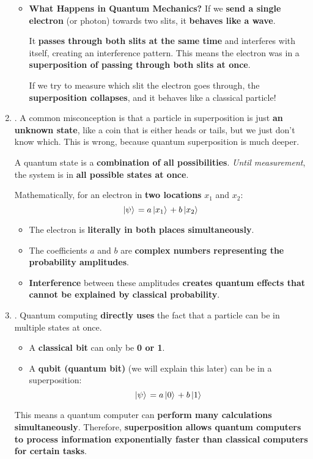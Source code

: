 \begin{enumerate}
\begin{itemize}[label=\textcolor{Green3}{}]
    \item \textcolor{Green3}{\textbf{What Happens in Quantum Mechanics?}} If we \textbf{send a single electron} (or photon) towards two slits, it \textbf{behaves like a wave}.

    It \textbf{passes through both slits at the same time} and interferes with itself, creating an interference pattern. This means the electron was in a \textbf{superposition of passing through both slits at once}.

    If we try to measure which slit the electron goes through, the \textbf{superposition collapses}, and it behaves like a classical particle!
  \end{itemize}


  \item {}. A common misconception is that a particle in superposition is just \textbf{an unknown state}, like a coin that is either heads or tails, but we just don't know which. This is wrong, because quantum superposition is much deeper.

  A quantum state is a \textbf{combination of all possibilities}. \emph{Until measurement}, the system is in \textbf{all possible states at once}.
  
  Mathematically, for an electron in \textbf{two locations} $x_{1}$ and $x_{2}$:
  \begin{equation*}
    \left| \psi \rangle\right. = a \left| x_{1} \rangle\right. + b \left| x_{2} \rangle\right.
  \end{equation*}
  \begin{itemize}
    \item The electron is \textbf{literally in both places simultaneously}.
    \item The coefficients $a$ and $b$ are \textbf{complex numbers representing the probability amplitudes}.
    \item \textbf{Interference} between these amplitudes \textbf{creates quantum effects that cannot be explained by classical probability}.
  \end{itemize}


  \item {}. Quantum computing \textbf{directly uses} the fact that a particle can be in multiple states at once.

  \begin{itemize}
    \item A \textbf{classical bit} can only be \textbf{0 or 1}.
    \item A \textbf{qubit (quantum bit)} (we will explain this later) can be in a superposition:
    \begin{equation*}
      \left| \psi \rangle\right. = a \left| 0 \rangle\right. + b \left| 1 \rangle\right.
    \end{equation*}
  \end{itemize}
  This means a quantum computer can \textbf{perform many calculations simultaneously}. Therefore, \textbf{superposition allows quantum computers to process information exponentially faster than classical computers for certain tasks}.


\end{enumerate}
